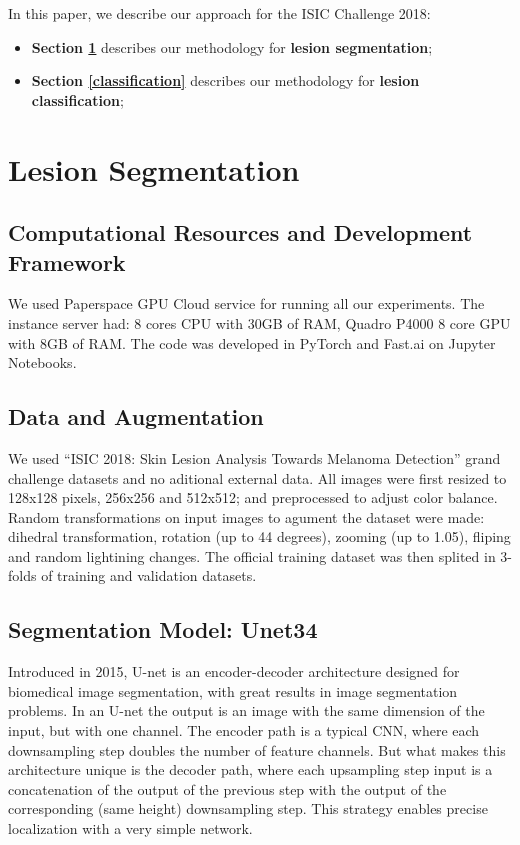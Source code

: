 \documentclass[conference]{IEEEtran}
\begin{document}
In this paper, we describe our approach for the ISIC Challenge 2018:
\begin{itemize}
\item \textbf{Section \ref{segmentation}} describes our methodology for \textbf{lesion segmentation};
\item \textbf{Section \ref{classification}} describes our methodology for \textbf{lesion classification};
\end{itemize}


\section{Lesion Segmentation}
\label{segmentation}
\subsection{Computational Resources and Development Framework\label{resources}}
We used Paperspace GPU Cloud service for running all our experiments. The instance server had: 8 cores CPU with 30GB of RAM, Quadro P4000 8 core GPU with 8GB of RAM. 
The code was developed in PyTorch and Fast.ai\cite{fastai} on Jupyter Notebooks.

\subsection{Data and Augmentation}
We used “ISIC 2018: Skin Lesion Analysis Towards Melanoma Detection” grand challenge datasets \cite{codella, ham} and no aditional external data. All images were first resized to 128x128 pixels, 256x256 and 512x512; and preprocessed to adjust color balance. Random transformations on input images to agument the dataset were made: dihedral transformation, rotation (up to 44 degrees), zooming (up to 1.05), fliping and random lightining changes. The official training dataset was then splited in 3-folds of training and validation datasets.  

\subsection{Segmentation Model: Unet34}
Introduced in 2015, U-net is an encoder-decoder architecture designed for biomedical image segmentation\cite{olaf}, with great results in image segmentation problems\cite{iglovikov}. In an U-net the output is an image with the same dimension of the input, but with one channel.  The encoder path is a typical CNN, where each downsampling step doubles the number of feature channels. But what makes this architecture unique is the decoder path, where each upsampling step input is a concatenation of the output of the previous step with the output of the corresponding (same height) downsampling step. This strategy enables precise localization with a very simple network. 
\end{document}
